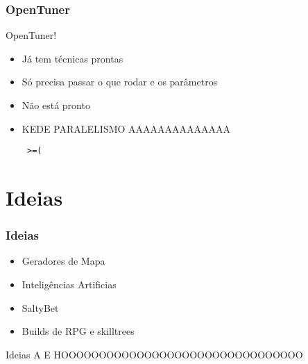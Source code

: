 \documentclass[10pt]{beamer}
\begin{document}
\begin{frame}[fragile]
  \frametitle{OpenTuner}
      OpenTuner!
      \pause
	  \begin{itemize}[<+- | alert@+>]
		\item Já tem técnicas prontas
		\item Só precisa passar o que rodar e os parâmetros
		\item Não está pronto
		\item KEDE PARALELISMO AAAAAAAAAAAAAA \begin{verbatim} >=(\end{verbatim}
		
	  \end{itemize}  
\end{frame}

\section{Ideias}

\begin{frame}[fragile]
  \frametitle{Ideias}
	  \begin{itemize}
	  	\item Geradores de Mapa
	  	\item Inteligências Artificias
	  	\item SaltyBet
	  	\item Builds de RPG e skilltrees
	  \end{itemize}
\end{frame}

\begin{frame}{Ideias}
	A
	\pause
	E
	\pause
	HOOOOOOOOOOOOOOOOOOOOOOOOOOOOOOOO
\end{frame}
\end{document}
